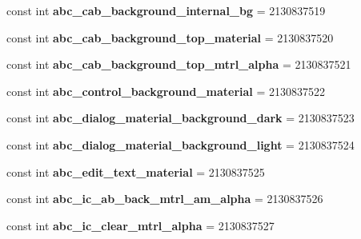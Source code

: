 \begin{DoxyCompactItemize}
const int {\bfseries abc\+\_\+cab\+\_\+background\+\_\+internal\+\_\+bg} = 2130837519
\item 
\mbox{\label{classXaria_1_1Resource_1_1Drawable_ae7284e3a4b804d2ec7a5bd1af19c234b}} 
const int {\bfseries abc\+\_\+cab\+\_\+background\+\_\+top\+\_\+material} = 2130837520
\item 
\mbox{\label{classXaria_1_1Resource_1_1Drawable_a5f16a95dddf7bc648db9b90d804bf2c3}} 
const int {\bfseries abc\+\_\+cab\+\_\+background\+\_\+top\+\_\+mtrl\+\_\+alpha} = 2130837521
\item 
\mbox{\label{classXaria_1_1Resource_1_1Drawable_ad48e8e62a5ddb3a83af153e7ab063545}} 
const int {\bfseries abc\+\_\+control\+\_\+background\+\_\+material} = 2130837522
\item 
\mbox{\label{classXaria_1_1Resource_1_1Drawable_acd05e9f386d7124a559fd49558ba11d8}} 
const int {\bfseries abc\+\_\+dialog\+\_\+material\+\_\+background\+\_\+dark} = 2130837523
\item 
\mbox{\label{classXaria_1_1Resource_1_1Drawable_a846857a65e39a54ad9e7ec56d55bbb48}} 
const int {\bfseries abc\+\_\+dialog\+\_\+material\+\_\+background\+\_\+light} = 2130837524
\item 
\mbox{\label{classXaria_1_1Resource_1_1Drawable_af8246e37f853e434282a8b1e1725ef3a}} 
const int {\bfseries abc\+\_\+edit\+\_\+text\+\_\+material} = 2130837525
\item 
\mbox{\label{classXaria_1_1Resource_1_1Drawable_a5d959aef84de95a987ed7d3676bcedee}} 
const int {\bfseries abc\+\_\+ic\+\_\+ab\+\_\+back\+\_\+mtrl\+\_\+am\+\_\+alpha} = 2130837526
\item 
\mbox{\label{classXaria_1_1Resource_1_1Drawable_a5b36c93314f65a1fbdcb03835fe76d1a}} 
const int {\bfseries abc\+\_\+ic\+\_\+clear\+\_\+mtrl\+\_\+alpha} = 2130837527
\item 
\mbox{\label{classXaria_1_1Resource_1_1Drawable_a020f9d598e60d7592d6b967032716632}} 

\end{DoxyCompactItemize}
